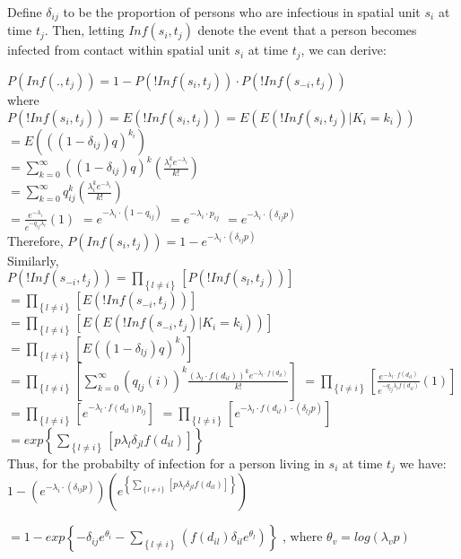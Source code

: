\documentclass[12pt]{article}
\newcommand \mbreak {\\ \vspace{0.1in}}
\begin{document}
Define $\delta_{ij}$ to be the proportion of persons who are infectious in spatial unit $s_i$ 
at time $t_j$. Then, letting $Inf(s_i, t_j)$ denote the event that a person becomes 
infected from contact within spatial unit $s_i$ at time $t_j$, we can derive:

\begin{center}

    $P(Inf(.,t_j)) = 1 - P(!Inf(s_i, t_j)) \cdot  P(!Inf(s_{-i}, t_j))$ \mbreak
    where \mbreak 
    $P(!Inf(s_i, t_j)) = E(!Inf(s_i, t_j)) = E(E(!Inf(s_i, t_j)|K_i=k_i))$  \mbreak 
    $\displaystyle =E(((1-\delta_{ij})q)^{k_i})$  \mbreak 
    $\displaystyle = \sum_{k=0}^{\infty} ((1-\delta_{ij})q)^k(\frac{\lambda_i^ke^{-\lambda_i}}{k!})$\mbreak
    $\displaystyle =  \sum_{k=0}^{\infty} q_{ij}^k (\frac{\lambda_i^ke^{-\lambda_i}}{k!})$\mbreak
    $\displaystyle = \frac{e^{-\lambda_i}}{e^{-q_{ij}\lambda_i}}(1)$
    $ = e^{-\lambda_i\cdot(1-q_{ij})} $
    $ = e^{-\lambda_i \cdot p_{ij}} $
    $ = e^{-\lambda_i \cdot (\delta_{ij}p)}$ \mbreak
    Therefore,  $P(Inf(s_i, t_j)) = 1 - e^{-\lambda_i \cdot (\delta_{ij}p)} $ \mbreak
    Similarly,\mbreak
    $\displaystyle P(!Inf(s_{-i}, t_j)) = \prod_{\left\{l \ne i\right\}}\left[P(!Inf(s_l, t_j)) \right]$ \mbreak
    $\displaystyle = \prod_{\left\{ l \ne i \right\}}\left[E(!Inf(s_{-i}, t_j))\right] $
    $\displaystyle = \prod_{\left\{ l \ne i \right\}}\left[E(E(!Inf(s_{-i}, t_j)|K_i=k_i)) \right]$  \mbreak 
    $\displaystyle = \prod_{\left\{ l \ne i \right\}}\left[ E((1-\delta_{lj})q)^k )  \right]$\mbreak 
    $\displaystyle = \prod_{\left\{ l \ne i \right\}}\left[ \sum_{k=0}^{\infty}(q_{lj}(i))^k\frac{(\lambda_l\cdot f(d_{il}))^ke^{-\lambda_l \cdot f(d_{il})}}{k!}    \right] $
    $\displaystyle = \prod_{\left\{ l \ne i \right\}}\left[ \frac{e^{-\lambda_l \cdot f(d_{il})}}{e^{-q_{lj}\lambda_l f(d_{il})}}(1)  \right]$\mbreak
    $\displaystyle = \prod_{\left\{ l \ne i \right\}}\left[ e^{-\lambda_l \cdot f(d_{il}) p_{lj}}  \right]$
    $\displaystyle = \prod_{\left\{ l \ne i \right\}}\left[ e^{-\lambda_l\cdot f(d_{il}) \cdot (\delta_{lj}p) }  \right]$\mbreak
    $\displaystyle = exp\left\{\sum_{\left\{ l \ne i \right\}}\left[p\lambda_l\delta_{jl}f(d_{il})   \right] \right\}$ \mbreak
    Thus, for the probabilty of infection for a person living in $s_i$ at time $t_j$ we have: \mbreak 
    $\displaystyle 1-\left(e^{-\lambda_i \cdot (\delta_{ij}p)}\right) \left( 
        e^{\left\{\sum_{\left\{ l \ne i \right\}}\left[p\lambda_l\delta_{jl}f(d_{il})   \right] \right\}}\right)
     $ \mbreak 

    $\displaystyle = 1- exp\left\{-\delta_{ij}e^{\theta_{i}} - \sum_{\left\{ l \ne i  \right\}}
        (f(d_{il})\delta_{il}e^{\theta_{l}})   \right\}$ 
    , where $\theta_{v} = log(\lambda_{v}p)$
 
\end{center}
\end{document}
